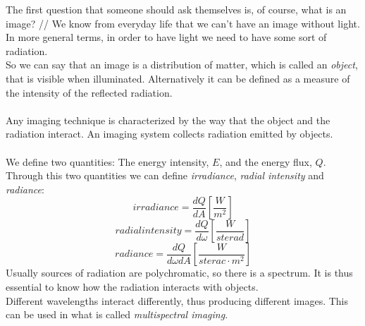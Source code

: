 The first question that someone should ask themselves is, of course, what is an image? //
We know from everyday life that we can't have an image without light. In more general terms, in order to have light we need to have some sort of radiation. \\ 
So we can say that an image is a distribution of matter, which is called an \textit{object}, that is visible when illuminated. Alternatively it can be defined as a measure of the intensity of the reflected radiation. \\ \\
Any imaging technique is characterized by the way that the object and the radiation interact. An imaging system collects radiation emitted by objects. \\ \\
We define two quantities: The energy intensity, $E$, and the energy flux, $Q$. \\
Through this two quantities we can define \textit{irradiance}, \textit{radial intensity} and \textit{radiance}:
$$
	irradiance = \frac{dQ}{dA} \left[\frac{W}{m^2}\right] 
$$
$$
	radial intensity = \frac{dQ}{d\omega} \left[\frac{W}{sterad}\right]
$$
$$
	radiance = \frac{dQ}{d\omega dA} \left[\frac{W}{sterac\cdot m^2}\right]
$$
Usually sources of radiation are polychromatic, so there is a spectrum. It is thus essential to know how the radiation interacts with objects.  \\
Different wavelengths interact differently, thus producing different images. This can be used in what is called \textit{multispectral imaging}. 
